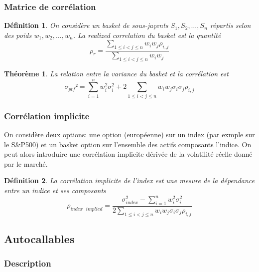 \documentclass[a4paper]{article}
\newtheorem{theorem}{Théorème}[section]
\newtheorem{definition}{Définition}
\begin{document}
\subsubsection{Matrice de corrélation}

\begin{definition}
    On considère un basket de sous-jaçents $S_1, S_2, \dots, S_n$ répartis selon des poids $w_1, w_2, \dots, w_n$. La realized correlation du basket est la quantité
    \begin{equation*}
        \rho_{r} = \frac{\sum_{1\leq i < j \leq n} w_{i}w_{j}\rho_{i,j}}{\sum_{1\leq i < j \leq n} w_{i}w_{j}}
    \end{equation*}
\end{definition}

\begin{theorem}
    La relation entre la variance du basket et la corrélation est
    \begin{equation}
        \sigma_{ptf}² = \sum_{i=1}^n w_{i}^2\sigma_i^2+ 2\sum_{1\leq i < j \leq n} w_{i}w_{j}\sigma_i \sigma_j \rho_{i,j}
    \end{equation}
\end{theorem}

\subsubsection{Corrélation implicite}

On considère deux options: une option (européenne) sur un index (par exmple sur le S\&P500) et un basket option sur l'ensemble des actifs composants l'indice. On peut alors introduire une corrélation implicite dérivée de la volatilité réelle donné par le marché.

\begin{definition}
    La corrélation implicite de l'index est une mesure de la dépendance entre un indice et ses composants
    \begin{equation*}
        \rho_{index\text{ }implied} = \frac{\sigma_{index}^2 - \sum_{i=1}^n w_{i}^2\sigma_i^2 }{2\sum_{1\leq i < j \leq n} w_{i}w_{j}\sigma_i \sigma_j \rho_{i,j}}
    \end{equation*}
\end{definition}

\subsection{Autocallables}

\subsubsection{Description}
\end{document}
